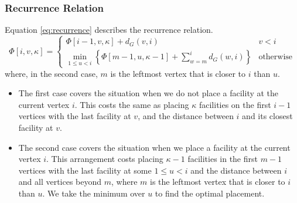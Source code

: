 \documentclass[9pt]{article}
\begin{document}
\subsubsection*{Recurrence Relation}
Equation \ref{eq:recurrence} describes the recurrence relation.
\begin{equation}
    \label{eq:recurrence}
    \Phi[i, v, \kappa] = \begin{cases}
        \Phi[i-1, v, \kappa] + d_{G}(v, i) & v < i \\
        \min_{1 \leq u < i} \left\{ \Phi[m-1, u, \kappa-1] + \sum_{w = m}^{i} d_{G}(w, i) \right\}
            & \text{otherwise}
    \end{cases}
\end{equation}
where, in the second case, $m$ is the leftmost vertex that is closer to $i$ than $u$.
\begin{itemize}
    \item The first case covers the situation when we do not place a facility at the current
    vertex $i$. This costs the same as placing $\kappa$ facilities on the first $i-1$ vertices
    with the last facility at $v$, and the distance between $i$ and its closest facility at $v$.
    \item The second case covers the situation when we place a facility at the current vertex
    $i$. This arrangement costs placing $\kappa-1$ facilities in the first $m-1$ vertices with
    the last facility at some $1 \leq u < i$ and the distance between $i$ and all vertices beyond
    $m$, where $m$ is the leftmost vertex that is closer to $i$ than $u$. We take the minimum
    over $u$ to find the optimal placement.
\end{itemize}
\end{document}

